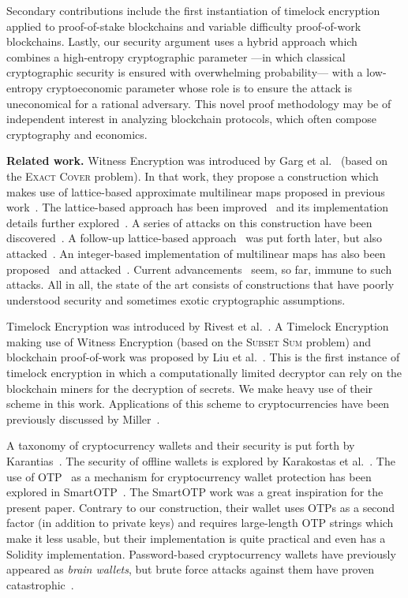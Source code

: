 Secondary contributions include the first instantiation of timelock encryption applied
to proof-of-stake blockchains and variable difficulty proof-of-work blockchains. Lastly,
our security argument uses a hybrid approach which combines a high-entropy
cryptographic parameter ---in which classical cryptographic security is ensured with overwhelming
probability--- with a low-entropy cryptoeconomic parameter whose role is to ensure the
attack is uneconomical for a rational adversary. This novel proof methodology may be of
independent interest in analyzing blockchain protocols, which often compose cryptography
and economics.

\noindent
\textbf{Related work.}
Witness Encryption was introduced by Garg et al.~\cite{STOC:GGSW13} (based on the \textsc{Exact
Cover} problem). In that
work, they propose a construction which makes use of lattice-based approximate multilinear
maps proposed in previous work~\cite{EC:GarGenHal13}. The lattice-based approach has been
improved~\cite{EC:LanSteSte14} and its implementation details further explored~\cite{AC:ACLL15}.
A series of attacks on this construction have been discovered~\cite{EC:CHLRS15,EC:HuJia16,PKC:CLLT17,C:CGHLMM15,C:AlbBaiDuc16,EPRINT:CheJeoLee16}.
A follow-up lattice-based approach~\cite{TCC:GenGorHal15} was put forth later, but also attacked~\cite{C:CLLT16}.
An integer-based implementation of multilinear maps has also been proposed~\cite{C:CorLepTib13,C:CorLepTib15} and
attacked~\cite{EC:CHLRS15,EPRINT:MinFou15,EPRINT:CheLeeRyu15}.
Current advancements~\cite{ma2018mmap} seem, so far, immune to such attacks.
All in all, the state of the art consists of constructions that have poorly
understood security and sometimes exotic cryptographic assumptions.

Timelock Encryption was introduced by Rivest et al.~\cite{timelock}. A Timelock Encryption
making use of Witness Encryption (based on the \textsc{Subset Sum} problem) and blockchain proof-of-work was proposed by Liu et
al.~\cite{timelock-bitcoin}. This is the first instance of timelock encryption in which
a computationally limited decryptor can rely on the blockchain miners for the decryption
of secrets. We make heavy use of their scheme in this work. Applications of this scheme to cryptocurrencies
have been previously discussed by Miller~\cite{miller-timelock}.

A taxonomy of cryptocurrency wallets and their security is put forth by Karantias~\cite{wallet-taxonomy}.
The security of offline wallets is explored by Karakostas et al.~\cite{hardware-wallets}.
The use of OTP~\cite{rfc6238,rfc4226} as a mechanism for cryptocurrency wallet protection has been explored in SmartOTP~\cite{smartotp}.
The SmartOTP work was a great inspiration for the present paper. Contrary to our construction, their
wallet uses OTPs as a second factor (in addition to private keys) and requires large-length OTP strings
which make it less usable, but their implementation is quite practical and even has a Solidity implementation.
Password-based cryptocurrency wallets have previously appeared as \emph{brain wallets},
but brute force attacks against them have proven catastrophic~\cite{brain-drain}.
